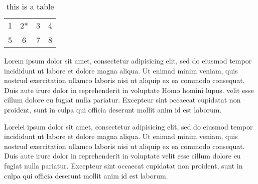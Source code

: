 \documentclass[12pt]{article}
\begin{document}
\begin{table}
  \begin{longtable}[l]{l c c r}
    \caption{this is a table}\\
    \hline
    1&2*&3&4\\
    5&6&7&8\\
    \hline
  \end{longtable}
\end{table}

Lorem ipsum dolor sit amet, consectetur adipisicing elit, sed do eiusmod tempor incididunt ut labore et dolore magna aliqua. Ut enimad minim veniam, quis nostrud exercitation ullamco laboris nisi ut aliquip ex ea commodo consequat. Duis aute irure dolor in reprehenderit in voluptate Homo homini lupus. velit esse cillum dolore eu fugiat nulla pariatur. Excepteur sint occaecat cupidatat non proident, sunt in culpa qui officia deserunt mollit anim id est laborum.

Lorelei ipsum dolor sit amet, consectetur adipisicing elit, sed do eiusmod tempor incididunt ut labore et dolore magna aliqua. Ut enimad minim veniam, quis nostrud exercitation ullamco laboris nisi ut aliquip ex ea commodo consequat. Duis aute irure dolor in reprehenderit in voluptate velit esse cillum dolore eu fugiat nulla pariatur. Excepteur sint occaecat cupidatat non proident, sunt in culpa qui officia deserunt mollit anim id est laborum.

\printbibliography[heading=bibnumbered]{}
\end{document}
